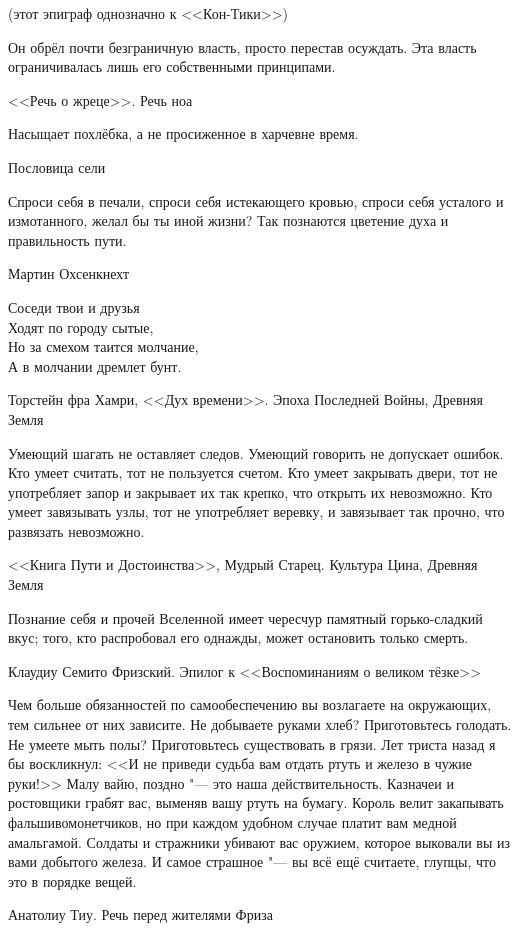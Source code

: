 (этот эпиграф однозначно к <<Кон-Тики>>)

\epigraph
{Он обрёл почти безграничную власть, просто перестав осуждать.
Эта власть ограничивалась лишь его собственными принципами.}
{<<Речь о жреце>>.
Речь ноа}

\epigraph
{Насыщает похлёбка, а не просиженное в харчевне время.}
{Пословица сели}

\epigraph
{Спроси себя в печали, спроси себя истекающего кровью, спроси себя усталого и измотанного, желал бы ты иной жизни?
Так познаются цветение духа и правильность пути.}
{Мартин Охсенкнехт}

\epigraph
{Соседи твои и друзья\\
Ходят по городу сытые,\\
Но за смехом таится молчание,\\
А в молчании дремлет бунт.}
{Торстейн фра Хамри, <<Дух времени>>.
Эпоха Последней Войны, Древняя Земля}

\epigraph
{Умеющий шагать не оставляет следов.
Умеющий говорить не допускает ошибок.
Кто умеет считать, тот не пользуется счетом.
Кто умеет закрывать двери, тот не употребляет запор и закрывает их так крепко, что открыть их невозможно.
Кто умеет завязывать узлы, тот не употребляет веревку, и завязывает так прочно, что развязать невозможно.}
{<<Книга Пути и Достоинства>>, Мудрый Старец.
Культура Цина, Древняя Земля}

\epigraph
{Познание себя и прочей Вселенной имеет чересчур памятный горько-сладкий вкус;
того, кто распробовал его однажды, может остановить только смерть.}
{Клаудиу Семито Фризский.
Эпилог к <<Воспоминаниям о великом тёзке>>}

\epigraph
{Чем больше обязанностей по самообеспечению вы возлагаете на окружающих, тем сильнее от них зависите.
Не добываете руками хлеб?
Приготовьтесь голодать.
Не умеете мыть полы?
Приготовьтесь существовать в грязи.
Лет триста назад я бы воскликнул: <<И не приведи судьба вам отдать ртуть\footnotemark{} и железо в чужие руки!>>
Малу вайю\footnotemark, поздно "--- это наша действительность.
Казначеи и ростовщики грабят вас, выменяв вашу ртуть на бумагу.
Король велит закапывать фальшивомонетчиков, но при каждом удобном случае платит вам медной амальгамой.
Солдаты и стражники убивают вас оружием, которое выковали вы из вами добытого железа.
И самое страшное "--- вы всё ещё считаете, глупцы, что это в порядке вещей.}
{Анатолиу Тиу.
Речь перед жителями Фриза}

